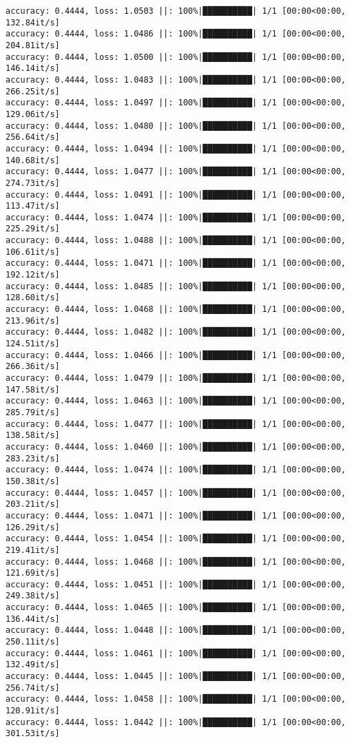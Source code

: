 \documentclass[
]{article}
\begin{document}
\begin{verbatim}
accuracy: 0.4444, loss: 1.0503 ||: 100%|██████████| 1/1 [00:00<00:00, 132.84it/s]
accuracy: 0.4444, loss: 1.0486 ||: 100%|██████████| 1/1 [00:00<00:00, 204.81it/s]
accuracy: 0.4444, loss: 1.0500 ||: 100%|██████████| 1/1 [00:00<00:00, 146.14it/s]
accuracy: 0.4444, loss: 1.0483 ||: 100%|██████████| 1/1 [00:00<00:00, 266.25it/s]
accuracy: 0.4444, loss: 1.0497 ||: 100%|██████████| 1/1 [00:00<00:00, 129.06it/s]
accuracy: 0.4444, loss: 1.0480 ||: 100%|██████████| 1/1 [00:00<00:00, 256.64it/s]
accuracy: 0.4444, loss: 1.0494 ||: 100%|██████████| 1/1 [00:00<00:00, 140.68it/s]
accuracy: 0.4444, loss: 1.0477 ||: 100%|██████████| 1/1 [00:00<00:00, 274.73it/s]
accuracy: 0.4444, loss: 1.0491 ||: 100%|██████████| 1/1 [00:00<00:00, 113.47it/s]
accuracy: 0.4444, loss: 1.0474 ||: 100%|██████████| 1/1 [00:00<00:00, 225.29it/s]
accuracy: 0.4444, loss: 1.0488 ||: 100%|██████████| 1/1 [00:00<00:00, 106.61it/s]
accuracy: 0.4444, loss: 1.0471 ||: 100%|██████████| 1/1 [00:00<00:00, 192.12it/s]
accuracy: 0.4444, loss: 1.0485 ||: 100%|██████████| 1/1 [00:00<00:00, 128.60it/s]
accuracy: 0.4444, loss: 1.0468 ||: 100%|██████████| 1/1 [00:00<00:00, 213.96it/s]
accuracy: 0.4444, loss: 1.0482 ||: 100%|██████████| 1/1 [00:00<00:00, 124.51it/s]
accuracy: 0.4444, loss: 1.0466 ||: 100%|██████████| 1/1 [00:00<00:00, 266.36it/s]
accuracy: 0.4444, loss: 1.0479 ||: 100%|██████████| 1/1 [00:00<00:00, 147.58it/s]
accuracy: 0.4444, loss: 1.0463 ||: 100%|██████████| 1/1 [00:00<00:00, 285.79it/s]
accuracy: 0.4444, loss: 1.0477 ||: 100%|██████████| 1/1 [00:00<00:00, 138.58it/s]
accuracy: 0.4444, loss: 1.0460 ||: 100%|██████████| 1/1 [00:00<00:00, 283.23it/s]
accuracy: 0.4444, loss: 1.0474 ||: 100%|██████████| 1/1 [00:00<00:00, 150.38it/s]
accuracy: 0.4444, loss: 1.0457 ||: 100%|██████████| 1/1 [00:00<00:00, 203.21it/s]
accuracy: 0.4444, loss: 1.0471 ||: 100%|██████████| 1/1 [00:00<00:00, 126.29it/s]
accuracy: 0.4444, loss: 1.0454 ||: 100%|██████████| 1/1 [00:00<00:00, 219.41it/s]
accuracy: 0.4444, loss: 1.0468 ||: 100%|██████████| 1/1 [00:00<00:00, 121.69it/s]
accuracy: 0.4444, loss: 1.0451 ||: 100%|██████████| 1/1 [00:00<00:00, 249.38it/s]
accuracy: 0.4444, loss: 1.0465 ||: 100%|██████████| 1/1 [00:00<00:00, 136.44it/s]
accuracy: 0.4444, loss: 1.0448 ||: 100%|██████████| 1/1 [00:00<00:00, 250.11it/s]
accuracy: 0.4444, loss: 1.0461 ||: 100%|██████████| 1/1 [00:00<00:00, 132.49it/s]
accuracy: 0.4444, loss: 1.0445 ||: 100%|██████████| 1/1 [00:00<00:00, 256.74it/s]
accuracy: 0.4444, loss: 1.0458 ||: 100%|██████████| 1/1 [00:00<00:00, 120.91it/s]
accuracy: 0.4444, loss: 1.0442 ||: 100%|██████████| 1/1 [00:00<00:00, 301.53it/s]

\end{verbatim}
\end{document}
